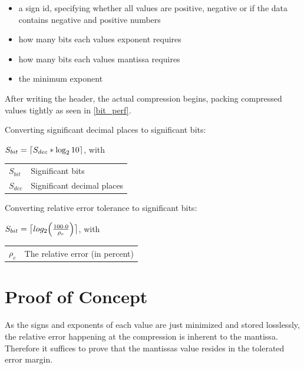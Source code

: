 \documentclass[
	12pt,
	a4paper,
	BCOR10mm,
	DIV14,
	headsepline,
]{scrreprt}
\DeclarePairedDelimiter{\ceil}{\lceil}{\rceil}
\begin{document}
\begin{itemize}
	\item a sign id, specifying whether all values are positive, negative or if the data
			contains negative and positive numbers
	\item how many bits each values exponent requires
	\item how many bits each values mantissa requires
	\item the minimum exponent
\end{itemize}

After writing the header, the actual compression begins, packing compressed
values tightly as seen in \cref{bit_perf}.

\bigskip

Converting significant decimal places to significant bits:

\bigskip

\begin{center}
	$S_{bit}=\ceil{S_{dec} * \log_{2}{10}}$, with

	\bigskip

	\begin{tabular}{ll}
		$S_{bit}$ & Significant bits \\
		$S_{dec}$ & Significant decimal places
	\end{tabular}
\end{center}

\clearpage

Converting relative error tolerance to significant bits:

\bigskip

\begin{center}
	$S_{bit}=\ceil[\big]{log_2{\left(\frac{100.0}{\rho_{e}}\right)}}$, with

	\bigskip

	\begin{tabular}{ll}
		$\rho_{e}$ & The relative error (in percent)
	\end{tabular}
\end{center}

\bigskip

\section{Proof of Concept}

\bigskip

As the signs and exponents of each value are just minimized and stored
losslessly, the relative error happening at the compression is inherent to the
mantissa. Therefore it suffices to prove that the mantissas value resides in
the tolerated error margin.
\end{document}
